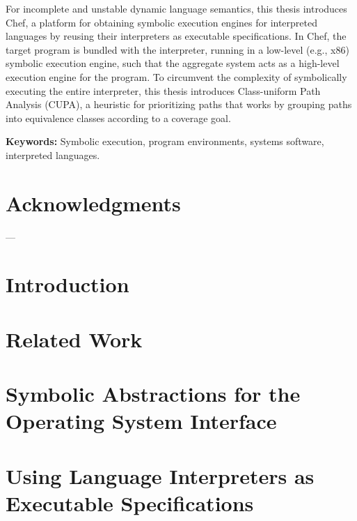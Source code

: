 \documentclass[letterpaper,10pt,oneside]{book}
\begin{document}
For incomplete and unstable dynamic language semantics, this thesis introduces Chef, a platform for obtaining symbolic execution engines for interpreted languages by reusing their interpreters as executable specifications.  In Chef, the target program is bundled with the interpreter, running in a low-level (e.g., x86) symbolic execution engine, such that the aggregate system acts as a high-level execution engine for the program.
%
%
To circumvent the complexity of symbolically executing the entire interpreter, this thesis introduces Class-uniform Path Analysis (CUPA), a heuristic for prioritizing paths that works by grouping paths into equivalence classes according to a coverage goal.

\noindent \textbf{Keywords:} Symbolic execution, program environments, systems software, interpreted languages.


\chapter*{Acknowledgments}

---

\tableofcontents
\listoffigures
\listoftables

\chapter{Introduction}
\label{ch:introduction}



\chapter{Related Work}
\label{ch:relatedwork}



\chapter{Symbolic Abstractions for the Operating System Interface}
\label{ch:cloud9}


\chapter{Using Language Interpreters as Executable Specifications}
\label{ch:chef}

\end{document}
